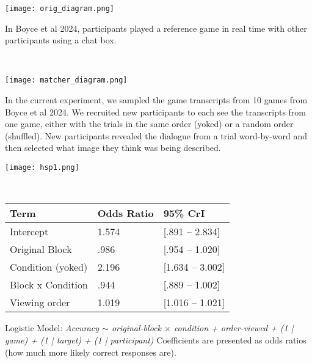 \documentclass[11pt,a4paper]{article}
\begin{document}
\newpage

\begin{center}\textbf{}\end{center}
\begin{minipage}{.4\textwidth}
	{	\texttt{[image: orig\_diagram.png]}} 
	
	\begin{small}
	In Boyce et al 2024, participants played a reference game in real time with other participants using a chat box.
	
\end{small}
	
\end{minipage}
~~~
\begin{minipage}{.55\textwidth}
{	\texttt{[image: matcher\_diagram.png]}} 
\begin{small}
	In the current experiment, we sampled the game transcripts from 10 games from Boyce et al 2024. We recruited new participants to each see the transcripts from one game, either with the trials in the same order (yoked) or a random order (shuffled).  New participants revealed the dialogue from a trial word-by-word and then selected what image they think was being described. 
	
\end{small}	
\end{minipage}


\begin{minipage}{.45\textwidth}
	{	\texttt{[image: hsp1.png]}} 
	\begin{small}
%
		
	\end{small}
	
\end{minipage}
~~
\begin{minipage}{.5\textwidth}
	\begin{small}

	\begin{tabular}{|l|l|l|}
		\hline
		Term & Odds Ratio & 95\% CrI \\
		\hline
		Intercept & 1.574 & [.891 -- 2.834] \\
		Original Block & .986 & [.954 -- 1.020] \\ 
		Condition (yoked) & 2.196 & [1.634 -- 3.002] \\
		Block x Condition & .944 & [.889 -- 1.002] \\
		Viewing order & 1.019 & [1.016 -- 1.021] \\
		\hline
	\end{tabular}
	\vspace{2pt}
	
	 Logistic Model: \textit{Accuracy $\sim$  original-block $\times$ condition + order-viewed + (1 | game) + (1 | target) + (1 | participant)  } Coefficients are presented as odds ratios (how much more likely correct responses are).
	 \end{small}
	 	
\end{minipage}
\end{document}
